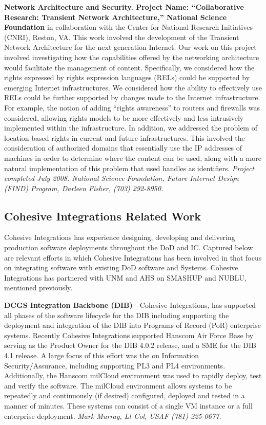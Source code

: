 \documentclass{sbir}
\begin{document}
{\bf Network Architecture and Security. Project Name: ``Collaborative Research: Transient Network Architecture,'' National Science Foundation} in collaboration with the Center for National Research Initiatives (CNRI), Reston, VA. This work involved the development of the Transient Network Architecture for the next generation Internet. Our work on this project involved investigating how the capabilities offered by the networking architecture would facilitate the management of content. Specifically, we considered how the rights expressed by rights expression languages (RELs) could be supported by emerging Internet infrastructures. We considered how the ability to effectively use RELs could be further supported by changes made to the Internet infrastructure. For example, the notion of adding ``rights awareness'' to routers and firewalls was considered, allowing rights models to be more effectively and less intrusively implemented within the infrastructure. In addition, we addressed the problem of location-based rights in current and future infrastructures. This involved the consideration of authorized domains that essentially use the IP addresses of machines in order to determine where the content can be used, along with a more natural implementation of this problem that used handles as identifiers. \emph{Project completed July 2008. National Science Foundation, Future Internet Design (FIND) Program, Darleen Fisher, (703) 292-8950.}

\subsection{Cohesive Integrations Related Work}
Cohesive Integrations has experience designing, developing and delivering production software deployments throughout the DoD and IC. Captured below are relevant efforts in which Cohesive Integrations has been involved in that focus on integrating software with existing DoD software and Systems. Cohesive Integrations has partnered with UNM and AHS on SMASHUP and NUBLU, mentioned previously.

{\bf DCGS Integration Backbone (DIB)}---Cohesive Integrations, has supported all phases of the software lifecycle for the DIB including supporting the deployment and integration of the DIB into Programs of Record (PoR) enterprise systems. Recently Cohesive Integrations supported Hanscom Air Force Base by serving as the Product Owner for the DIB 4.0.2 release, and a SME for the DIB 4.1 release. A large focus of this effort was the on Information Security/Assurance, including supporting PL3 and PL4 environments. Additionally, the Hanscom milCloud environment was used to rapidly deploy, test and verify the software. The milCloud environment allows systems to be repeatedly and continuously (if desired) configured, deployed and tested in a manner of minutes. These systems can consist of a single VM instance or a full enterprise deployment. \emph{Mark Murray, Lt Col, USAF (781)-225-0677.}
\end{document}
